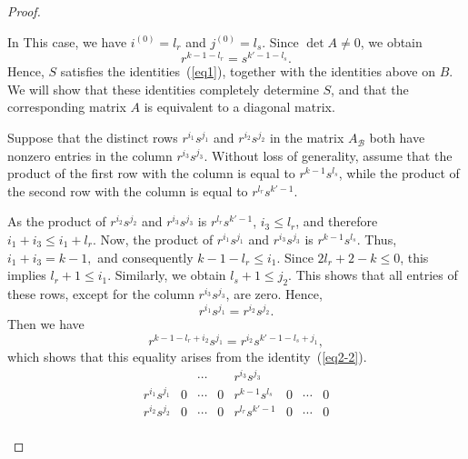 \documentclass[11pt,reqno]{amsart}
\theoremstyle{plain}
\theoremstyle{remark}
\theoremstyle{definition}
\begin{document}
\begin{proof}
\begin{enumerate}
In This case, we have $i^{(0)}=l_r$ and $j^{(0)}= l_s$.
%
%
Since $\det A \neq 0$, we obtain
\begin{equation}\label{eq2-2}
r^{k-1-l_r} = s^{k'-1-l_s}.
\end{equation}
Hence, $S$ satisfies the identities~(\ref{eq1}), together with the identities above on $B$. We will show that these identities completely determine $S$, and that the corresponding matrix $A$ is equivalent to a diagonal matrix.

Suppose that the distinct rows $r^{i_1}s^{j_1}$ and $r^{i_2}s^{j_2}$ in the matrix $A_{\mathcal B}$ both have nonzero entries in the column $r^{i_3}s^{j_3}$.
Without loss of generality, assume that the product of the first row with the column is equal to $r^{k-1}s^{l_s}$, while the product of the second row with the column is equal to $r^{l_r}s^{k'-1}$.

As the product of $r^{i_2}s^{j_2}$ and $r^{i_3}s^{j_3}$ is $r^{l_r}s^{k'-1}$, $i_3 \leq l_r$, and therefore
\(
i_1 + i_3 \leq i_1 + l_r.
\)
Now, the product of $r^{i_1}s^{j_1}$ and $r^{i_3}s^{j_3}$ is $r^{k-1}s^{l_s}$. Thus,
\(
i_1 + i_3 = k-1,
\)
and consequently
\(
k-1-l_r \leq i_1.
\)
Since $2l_r+2-k \leq 0$, this implies
\(
l_r+1 \leq i_1.
\)
Similarly, we obtain
\(
l_s+1 \leq j_2.
\) This shows that all entries of these rows, except for the column $r^{i_3}s^{j_3}$, are zero. Hence,
\[
r^{i_1}s^{j_1} = r^{i_2}s^{j_2}.
\]
Then we have
\[
r^{k-1-l_r+i_2}s^{j_1} = r^{i_2}s^{k'-1-l_s+j_1},
\]
which shows that this equality arises from the identity~(\ref{eq2-2}).
\[\begin{array}{c|cccccccc}
                      &~  & \cdots &~  & r^{i_3}s^{j_3}     &~&~&~\\ \hline
r^{i_1}s^{j_1} & 0  & \cdots & 0 & r^{k-1}s^{l_s}  &0&\cdots&0 \\
r^{i_2}s^{j_2} & 0  & \cdots & 0 & r^{l_r}s^{k'-1}  &0&\cdots&0\\
\end{array}
\]
\end{enumerate}
\end{proof}
\end{document}

